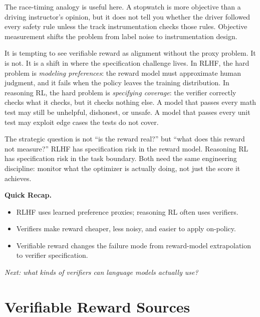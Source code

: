 The race-timing analogy is useful here. A stopwatch is more objective than a driving instructor's opinion, but it does not tell you whether the driver followed every safety rule unless the track instrumentation checks those rules. Objective measurement shifts the problem from label noise to instrumentation design.

\begin{tcolorbox}[colback=blue!5, colframe=blue!40, title=\textbf{Verifiable Reward Moves the Hard Problem, Not Solves It}]
It is tempting to see verifiable reward as alignment without the proxy problem. It is not. It is a shift in where the specification challenge lives. In RLHF, the hard problem is \emph{modeling preferences}: the reward model must approximate human judgment, and it fails when the policy leaves the training distribution. In reasoning RL, the hard problem is \emph{specifying coverage}: the verifier correctly checks what it checks, but it checks nothing else. A model that passes every math test may still be unhelpful, dishonest, or unsafe. A model that passes every unit test may exploit edge cases the tests do not cover.

The strategic question is not ``is the reward real?'' but ``what does this reward not measure?'' RLHF has specification risk in the reward model. Reasoning RL has specification risk in the task boundary. Both need the same engineering discipline: monitor what the optimizer is actually doing, not just the score it achieves.
\end{tcolorbox}

\begin{quickrecap}
\textbf{Quick Recap.}
\begin{itemize}[nosep,leftmargin=1.5em]
  \item RLHF uses learned preference proxies; reasoning RL often uses verifiers.
  \item Verifiers make reward cheaper, less noisy, and easier to apply on-policy.
  \item Verifiable reward changes the failure mode from reward-model extrapolation to verifier specification.
\end{itemize}
\textit{Next: what kinds of verifiers can language models actually use?}
\end{quickrecap}


\section{Verifiable Reward Sources}
\label{sec:verifiable-reward-sources}


